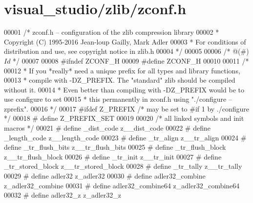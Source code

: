 \hypertarget{visual__studio_2zlib_2zconf_8h_source}{}\section{visual\+\_\+studio/zlib/zconf.h}
\label{visual__studio_2zlib_2zconf_8h_source}

\begin{DoxyCode}
00001 \textcolor{comment}{/* zconf.h -- configuration of the zlib compression library}
00002 \textcolor{comment}{ * Copyright (C) 1995-2016 Jean-loup Gailly, Mark Adler}
00003 \textcolor{comment}{ * For conditions of distribution and use, see copyright notice in zlib.h}
00004 \textcolor{comment}{ */}
00005 
00006 \textcolor{comment}{/* @(#) $Id$ */}
00007 
00008 \textcolor{preprocessor}{#ifndef ZCONF\_H}
00009 \textcolor{preprocessor}{#define ZCONF\_H}
00010 
00011 \textcolor{comment}{/*}
00012 \textcolor{comment}{ * If you *really* need a unique prefix for all types and library functions,}
00013 \textcolor{comment}{ * compile with -DZ\_PREFIX. The "standard" zlib should be compiled without it.}
00014 \textcolor{comment}{ * Even better than compiling with -DZ\_PREFIX would be to use configure to set}
00015 \textcolor{comment}{ * this permanently in zconf.h using "./configure --zprefix".}
00016 \textcolor{comment}{ */}
00017 \textcolor{preprocessor}{#ifdef Z\_PREFIX     }\textcolor{comment}{/* may be set to #if 1 by ./configure */}\textcolor{preprocessor}{}
00018 \textcolor{preprocessor}{#  define Z\_PREFIX\_SET}
00019 
00020 \textcolor{comment}{/* all linked symbols and init macros */}
00021 \textcolor{preprocessor}{#  define \_dist\_code            z\_\_dist\_code}
00022 \textcolor{preprocessor}{#  define \_length\_code          z\_\_length\_code}
00023 \textcolor{preprocessor}{#  define \_tr\_align             z\_\_tr\_align}
00024 \textcolor{preprocessor}{#  define \_tr\_flush\_bits        z\_\_tr\_flush\_bits}
00025 \textcolor{preprocessor}{#  define \_tr\_flush\_block       z\_\_tr\_flush\_block}
00026 \textcolor{preprocessor}{#  define \_tr\_init              z\_\_tr\_init}
00027 \textcolor{preprocessor}{#  define \_tr\_stored\_block      z\_\_tr\_stored\_block}
00028 \textcolor{preprocessor}{#  define \_tr\_tally             z\_\_tr\_tally}
00029 \textcolor{preprocessor}{#  define adler32               z\_adler32}
00030 \textcolor{preprocessor}{#  define adler32\_combine       z\_adler32\_combine}
00031 \textcolor{preprocessor}{#  define adler32\_combine64     z\_adler32\_combine64}
00032 \textcolor{preprocessor}{#  define adler32\_z             z\_adler32\_z}

\end{DoxyCode}
